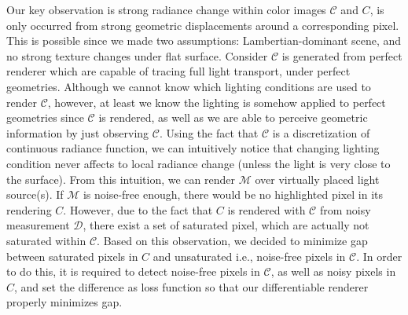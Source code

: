 Our key observation is strong radiance change within color images $\mathcal{C}$ and $C$, is only occurred from strong geometric displacements around a corresponding pixel. 
This is possible since we made two assumptions: Lambertian-dominant scene, and no strong texture changes under flat surface. 
Consider $\mathcal{C}$ is generated from perfect renderer 
which are capable of tracing full light transport, under perfect geometries. 
Although we cannot know which lighting conditions are used to render $\mathcal{C}$, 
however, at least we know the lighting is somehow applied to 
perfect geometries since $\mathcal{C}$ is rendered, as well as we are able to perceive geometric information by just observing $\mathcal{C}$. 
Using the fact that $\mathcal{C}$ is a discretization of continuous radiance function, 
we can intuitively notice that changing lighting condition 
never affects to local radiance change (unless the light is very close to the surface).
From this intuition, we can render $\mathcal{M}$ over virtually placed light source(s). 
If $\mathcal{M}$ is noise-free enough, there would be no highlighted pixel in its rendering $C$. 
However, due to the fact that $C$ is rendered with $\mathcal{C}$ from noisy measurement $\mathcal{D}$, 
there exist a set of saturated pixel, which are actually not saturated within $\mathcal{C}$. 
Based on this observation, we decided to minimize gap between saturated pixels in $C$ and unsaturated i.e., noise-free pixels in $\mathcal{C}$. 
In order to do this, it is required to detect noise-free pixels in $\mathcal{C}$, as well as noisy pixels in $C$, 
and set the difference as loss function so that our differentiable renderer properly minimizes gap.

